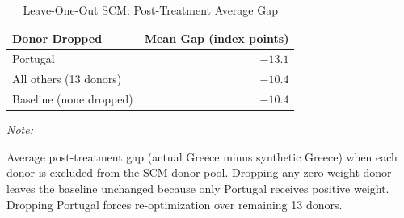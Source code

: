 \begin{table}[!h]
\centering
\caption{\label{tab:tabC1_loo}Leave-One-Out SCM: Post-Treatment Average Gap}
\centering
\begin{threeparttable}
\begin{tabular}[t]{lr}
\toprule
Donor Dropped & Mean Gap (index points)\\
\midrule
Portugal & $-13.1$\\
All others (13 donors) & $-10.4$\\
\midrule
Baseline (none dropped) & $-10.4$\\
\bottomrule
\end{tabular}
\begin{tablenotes}
\item \textit{Note: }
\item Average post-treatment gap (actual Greece minus synthetic Greece) when each donor is excluded from the SCM donor pool. Dropping any zero-weight donor leaves the baseline unchanged because only Portugal receives positive weight. Dropping Portugal forces re-optimization over remaining 13 donors.
\end{tablenotes}
\end{threeparttable}
\end{table}
